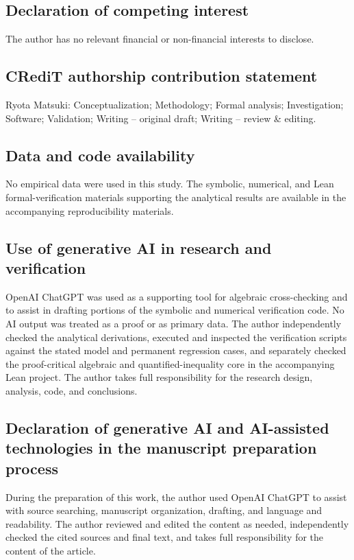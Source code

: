 \documentclass[11pt]{article}
\begin{document}
\subsection*{Declaration of competing interest}
The author has no relevant financial or non-financial interests to disclose.

\subsection*{CRediT authorship contribution statement}
Ryota Matsuki: Conceptualization; Methodology; Formal analysis; Investigation; Software; Validation; Writing -- original draft; Writing -- review \& editing.

\subsection*{Data and code availability}
No empirical data were used in this study. The symbolic, numerical, and Lean formal-verification materials supporting the analytical results are available in the accompanying reproducibility materials.

\subsection*{Use of generative AI in research and verification}
OpenAI ChatGPT was used as a supporting tool for algebraic cross-checking and to assist in drafting portions of the symbolic and numerical verification code. No AI output was treated as a proof or as primary data. The author independently checked the analytical derivations, executed and inspected the verification scripts against the stated model and permanent regression cases, and separately checked the proof-critical algebraic and quantified-inequality core in the accompanying Lean project. The author takes full responsibility for the research design, analysis, code, and conclusions.

\subsection*{Declaration of generative AI and AI-assisted technologies in the manuscript preparation process}
During the preparation of this work, the author used OpenAI ChatGPT to assist with source searching, manuscript organization, drafting, and language and readability. The author reviewed and edited the content as needed, independently checked the cited sources and final text, and takes full responsibility for the content of the article.



\end{document}
